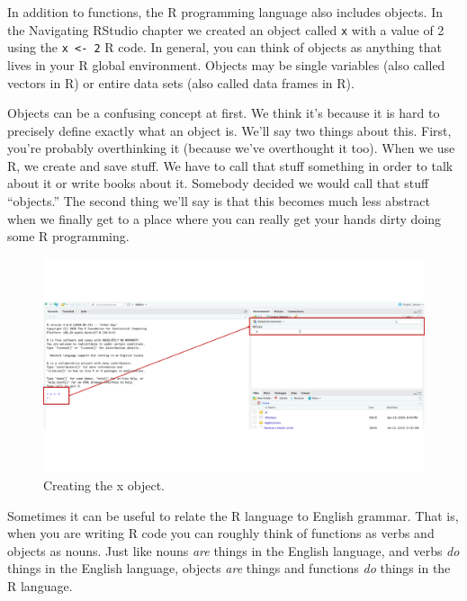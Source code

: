 \documentclass[
  letterpaper,
  DIV=11,
  numbers=noendperiod]{scrreprt}
\begin{document}
In addition to functions, the R programming language also includes
objects. In the Navigating RStudio chapter we created an object called
\texttt{x} with a value of 2 using the \texttt{x\ \textless{}-\ 2} R
code. In general, you can think of objects as anything that lives in
your R global environment. Objects may be single variables (also called
vectors in R) or entire data sets (also called data frames in R).

Objects can be a confusing concept at first. We think it's because it is
hard to precisely define exactly what an object is. We'll say two things
about this. First, you're probably overthinking it (because we've
overthought it too). When we use R, we create and save stuff. We have to
call that stuff something in order to talk about it or write books about
it. Somebody decided we would call that stuff ``objects.'' The second
thing we'll say is that this becomes much less abstract when we finally
get to a place where you can really get your hands dirty doing some R
programming.

\begin{figure}[H]

{\centering \includegraphics{chapters/speaking_r/objects.png}

}

\caption{Creating the x object.}

\end{figure}%

Sometimes it can be useful to relate the R language to English grammar.
That is, when you are writing R code you can roughly think of functions
as verbs and objects as nouns. Just like nouns \emph{are} things in the
English language, and verbs \emph{do} things in the English language,
objects \emph{are} things and functions \emph{do} things in the R
language.
\end{document}
